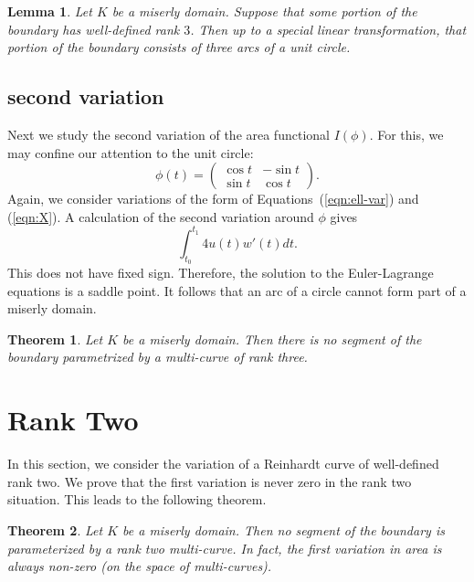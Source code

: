 \documentclass[11pt]{amsart}
\newtheorem{thm}{Theorem}
\newtheorem{lemma}{Lemma}
\begin{document}
\begin{lemma}  Let $K$ be a miserly domain.  Suppose that some portion of the boundary
has well-defined rank $3$.  Then up to a special linear transformation, that portion of the boundary
consists of three arcs of a unit circle.
\end{lemma}


\subsection{second variation}

Next we study the second variation of the area functional $I(\phi)$.  For this,
we may confine our attention to the unit circle:
$$
\phi(t) = \begin{pmatrix} \cos t & -\sin t \\ \sin t & \cos t
\end{pmatrix}.
$$
Again, we consider variations of the form of Equations~(\ref{eqn:ell-var}) and (\ref{eqn:X}).
A calculation of the second variation around $\phi$ gives
$$
\int_{t_0}^{t_1} 4 u(t) w'(t) dt.
$$
This does not have fixed sign.  Therefore, the solution to the Euler-Lagrange equations is a saddle point. 
It follows that an arc of a circle cannot form part of a miserly domain.

\begin{thm}  Let $K$ be a miserly domain.  Then there is no segment
of the boundary parametrized by a multi-curve of  rank  three.
\end{thm}



\section{Rank Two}


In this section, we consider the variation of a Reinhardt curve
of well-defined rank two. 
We prove that the first variation is never zero in the rank two situation.  This leads to the following theorem. 

\begin{thm}  Let $K$ be a miserly domain.  Then no segment of the boundary is parameterized by a rank two multi-curve.  In fact, the first variation in area is always non-zero (on the space of multi-curves).
\end{thm}
\end{document}
